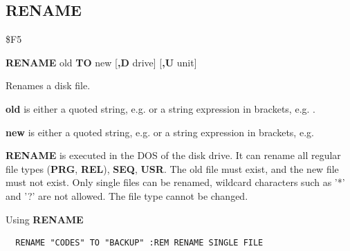 \subsection{RENAME}
\begin{description}[leftmargin=2cm,style=nextline]
\item [Token:] \$F5
\item [Format:] {\bf RENAME} old {\bf TO} new [{\bf,D} drive] [{\bf,U} unit]
\item [Usage:] Renames a disk file.

   {\bf old} is either a quoted string, e.g.  or
   a string expression in brackets, e.g. .

   {\bf new} is either a quoted string, e.g.  or
   a string expression in brackets, e.g. 

   \drivedefinition

   \unitdefinition

\item [Remarks:]
   {\bf RENAME} is executed in the DOS of the disk drive.
   It can rename all regular file types ({\bf PRG}, {\bf REL}), {\bf SEQ}, {\bf USR}.
   The old file must exist, and the new file must not exist.
   Only single files can be renamed, wildcard characters such as
   '*' and '?' are not allowed. The file type cannot be changed.

\item [Example:] Using {\bf RENAME}
\begin{tcolorbox}[colback=black,coltext=white]
\verbatimfont{\codefont}
\begin{verbatim}
  RENAME "CODES" TO "BACKUP" :REM RENAME SINGLE FILE
\end{verbatim}
\end{tcolorbox}
\end{description}


\newpage
